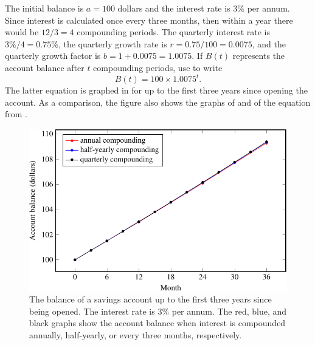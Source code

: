 \documentclass[a4paper,oneside,12pt]{article}
\begin{document}
\begin{solution}
The initial balance is $a = 100$ dollars and the interest rate is
$3\%$ per annum.  Since interest is calculated once every three
months, then within a year there would be $12 / 3 = 4$ compounding
periods.  The quarterly interest rate is $3\% / 4 = 0.75\%$, the
quarterly growth rate is $r = 0.75 / 100 = 0.0075$, and the quarterly
growth factor is $b = 1 + 0.0075 = 1.0075$.  If $B(t)$ represents the
account balance after $t$ compounding periods, use
 to write
\begin{equation}
\label{eqn:exponential:savings_quarterly_compounding}
B(t)
=
100 \times 1.0075^t.
\end{equation}
The latter equation is graphed in
 for up to the first three
years since opening the account.  As a comparison, the figure also
shows the graphs of
 and of the
equation from
.

\begin{figure}[!htbp]
\centering
\includegraphics[scale=1.1]{image/11/interest-quarterly.pdf}
\caption{%
  The balance of a savings account up to the first three years since
  being opened.  The interest rate is $3\%$ per annum.  The red, blue,
  and black graphs show the account balance when interest is
  compounded annually, half-yearly, or every three months,
  respectively.
}
\label{fig:exponential:savings_quarterly}
\end{figure}


\end{solution}
\end{document}

